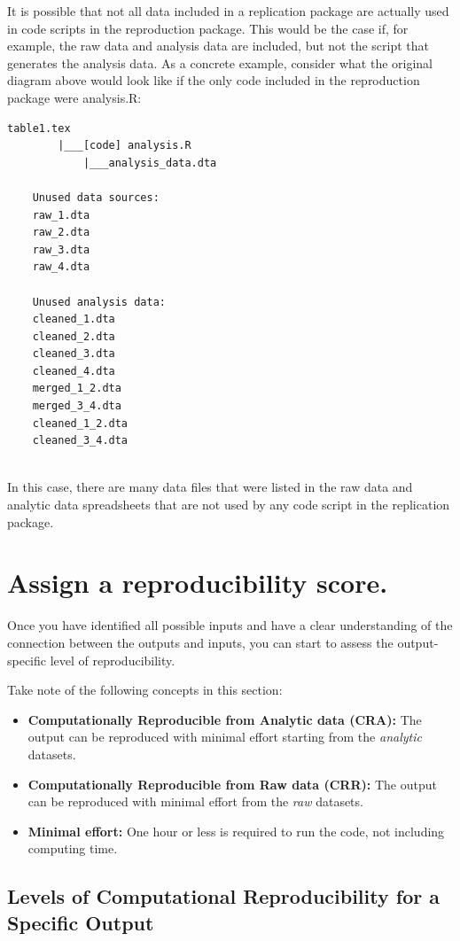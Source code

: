 \documentclass[]{book}
\begin{document}
It is possible that not all data included in a replication package are actually used in code scripts in the reproduction package. This would be the case if, for example, the raw data and analysis data are included, but not the script that generates the analysis data. As a concrete example, consider what the original diagram above would look like if the only code included in the reproduction package were analysis.R:

\begin{verbatim}
table1.tex
        |___[code] analysis.R
            |___analysis_data.dta
    
    Unused data sources:
    raw_1.dta
    raw_2.dta
    raw_3.dta
    raw_4.dta
    
    Unused analysis data:
    cleaned_1.dta
    cleaned_2.dta
    cleaned_3.dta
    cleaned_4.dta
    merged_1_2.dta
    merged_3_4.dta
    cleaned_1_2.dta
    cleaned_3_4.dta
    
\end{verbatim}

In this case, there are many data files that were listed in the raw data and analytic data spreadsheets that are not used by any code script in the replication package.

\hypertarget{score}{%
\section{Assign a reproducibility score.}\label{score}}

Once you have identified all possible inputs and have a clear understanding of the connection between the outputs and inputs, you can start to assess the output-specific level of reproducibility.

Take note of the following concepts in this section:

\begin{itemize}
\item
  \textbf{Computationally Reproducible from Analytic data (CRA):} The output can be reproduced with minimal effort starting from the \emph{analytic} datasets.
\item
  \textbf{Computationally Reproducible from Raw data (CRR):} The output can be reproduced with minimal effort from the \emph{raw} datasets.
\item
  \textbf{Minimal effort:} One hour or less is required to run the code, not including computing time.
\end{itemize}

\hypertarget{levels-of-computational-reproducibility-for-a-specific-output}{%
\subsection{Levels of Computational Reproducibility for a Specific Output}\label{levels-of-computational-reproducibility-for-a-specific-output}}
\end{document}

